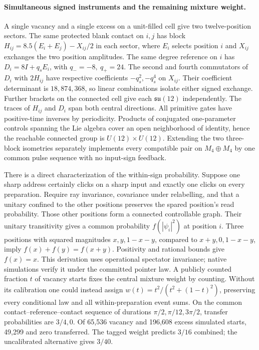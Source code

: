 \documentclass[11pt]{article}
\begin{document}
\paragraph{Simultaneous signed instruments and the remaining mixture weight.}
A single vacancy and a single excess on a unit-filled cell give two
twelve-position sectors. The same protected blank contact on \(i,j\) has
block \(H_{ij}=8.5(E_i+E_j)-X_{ij}/2\) in each sector, where \(E_i\)
selects position \(i\) and \(X_{ij}\) exchanges the two position
amplitudes. The same degree reference on \(i\) has
\(D_i=8I+q_sE_i\), with \(q_-=-8,\ q_+=24\). The second and fourth
commutators of \(D_i\) with \(2H_{ij}\) have respective coefficients
\(-q_s^2,-q_s^4\) on \(X_{ij}\). Their coefficient determinant is
\(18{,}874{,}368\), so linear combinations isolate either signed exchange.
Further brackets on the connected cell give each
\(\mathfrak{su}(12)\) independently. The traces of \(H_{ij}\) and \(D_i\)
span both central directions. All primitive gates have positive-time
inverses by periodicity. Products of conjugated one-parameter controls
spanning the Lie algebra cover an open neighborhood of identity, hence the
reachable connected group is \(U(12)\times U(12)\). Extending the two
three-block isometries separately implements every compatible pair on
\(M_4\oplus M_4\) by one common pulse sequence with no input-sign feedback.

There is a direct characterization of the within-sign probability. Suppose
one sharp address certainly clicks on a sharp input and exactly one clicks
on every preparation. Require ray invariance, covariance under relabelling,
and that a unitary confined to the other positions preserves the spared
position's read probability. Those other positions form a connected
controllable graph. Their unitary transitivity gives a common probability
\(f(|\psi_i|^2)\) at position \(i\). Three positions with squared magnitudes
\(x,y,1-x-y\), compared to \(x+y,0,1-x-y\), imply
\(f(x)+f(y)=f(x+y)\). Positivity and rational bounds give \(f(x)=x\).
This derivation uses operational spectator invariance; native simulations
verify it under the committed pointer law. A publicly counted fraction
\(t\) of vacancy starts fixes the central mixture weight by counting.
Without its calibration one could instead assign
\(w(t)=t^2/(t^2+(1-t)^2)\), preserving every conditional law and all
within-preparation event sums. On the common contact--reference--contact
sequence of durations \(\pi/2,\pi/12,3\pi/2\), transfer probabilities are
\(3/4,0\). Of 65,536 vacancy and 196,608 excess simulated starts, 49,299
and zero transferred. The tagged weight predicts \(3/16\) combined; the
uncalibrated alternative gives \(3/40\).
\end{document}
